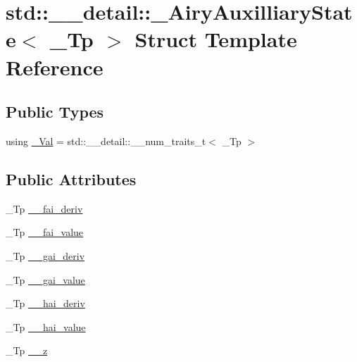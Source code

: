 \hypertarget{structstd_1_1____detail_1_1__AiryAuxilliaryState}{}\section{std\+:\+:\+\_\+\+\_\+detail\+:\+:\+\_\+\+Airy\+Auxilliary\+State$<$ \+\_\+\+Tp $>$ Struct Template Reference}
\label{structstd_1_1____detail_1_1__AiryAuxilliaryState}
\subsection*{Public Types}
\begin{DoxyCompactItemize}
\item 
using \hyperlink{structstd_1_1____detail_1_1__AiryAuxilliaryState_a5f44a95a23b7c60f0b748df5f7f24f26}{\+\_\+\+Val} = std\+::\+\_\+\+\_\+detail\+::\+\_\+\+\_\+num\+\_\+traits\+\_\+t$<$ \+\_\+\+Tp $>$
\end{DoxyCompactItemize}
\subsection*{Public Attributes}
\begin{DoxyCompactItemize}
\item 
\+\_\+\+Tp \hyperlink{structstd_1_1____detail_1_1__AiryAuxilliaryState_acff728bf75b30e81549a554ef4c149c1}{\+\_\+\+\_\+fai\+\_\+deriv}
\item 
\+\_\+\+Tp \hyperlink{structstd_1_1____detail_1_1__AiryAuxilliaryState_a71f1d48076c4a91aa4420c0ba3795c42}{\+\_\+\+\_\+fai\+\_\+value}
\item 
\+\_\+\+Tp \hyperlink{structstd_1_1____detail_1_1__AiryAuxilliaryState_a8b653323b9665a4f1768017d3a0e9051}{\+\_\+\+\_\+gai\+\_\+deriv}
\item 
\+\_\+\+Tp \hyperlink{structstd_1_1____detail_1_1__AiryAuxilliaryState_a224d18498e87293887fc8430f87ae12e}{\+\_\+\+\_\+gai\+\_\+value}
\item 
\+\_\+\+Tp \hyperlink{structstd_1_1____detail_1_1__AiryAuxilliaryState_a9aa3de91e8f462bf18033fcc2cfee571}{\+\_\+\+\_\+hai\+\_\+deriv}
\item 
\+\_\+\+Tp \hyperlink{structstd_1_1____detail_1_1__AiryAuxilliaryState_aaa9bc55d2a2d9be324651966cd008a28}{\+\_\+\+\_\+hai\+\_\+value}
\item 
\+\_\+\+Tp \hyperlink{structstd_1_1____detail_1_1__AiryAuxilliaryState_a276bc30e3202259480073e2835075399}{\+\_\+\+\_\+z}
\end{DoxyCompactItemize}


